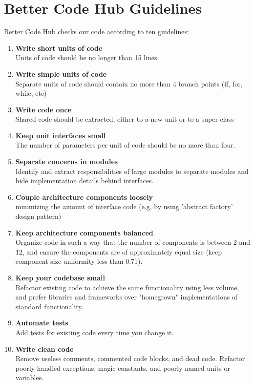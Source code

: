 \chapter{Better Code Hub Guidelines}\label{bch_guidelines}

Better Code Hub \cite{better_code_hub} checks our code according to ten guidelines:
\begin{enumerate}
    \item \textbf {Write short units of code} \\
    Units of code should be no longer than 15 lines.
    \item \textbf {Write simple units of code} \\
    Separate units of code should contain no more than 4 branch points (if, for, while, etc)
    \item \textbf{Write code once} \\
    Shared code should be extracted, either to a new unit or to a super class
    \item \textbf{Keep unit interfaces small} \\
    The number of parameters per unit of code should be no more than four.
    \item \textbf{Separate concerns in modules} \\
    Identify and extract responsibilities of large modules to separate modules and hide implementation details behind interfaces.
    \item \textbf{Couple architecture components loosely} \\
    minimizing the amount of interface code (e.g. by using 'abstract factory' design pattern)
    \item \textbf{Keep architecture components balanced} \\
    Organize code in such a way that the number of components is between 2 and 12, and ensure the components are of approximately equal size (keep component size uniformity less than 0.71).
    \item \textbf{Keep your codebase small} \\
    Refactor existing code to achieve the same functionality using less volume, and prefer libraries and frameworks over "homegrown" implementations of standard functionality.
    \item \textbf{Automate tests} \\
    Add tests for existing code every time you change it.
    \item \textbf{Write clean code}\\
    Remove useless comments, commented code blocks, and dead code. Refactor poorly handled exceptions, magic constants, and poorly named units or variables.  
\end{enumerate}